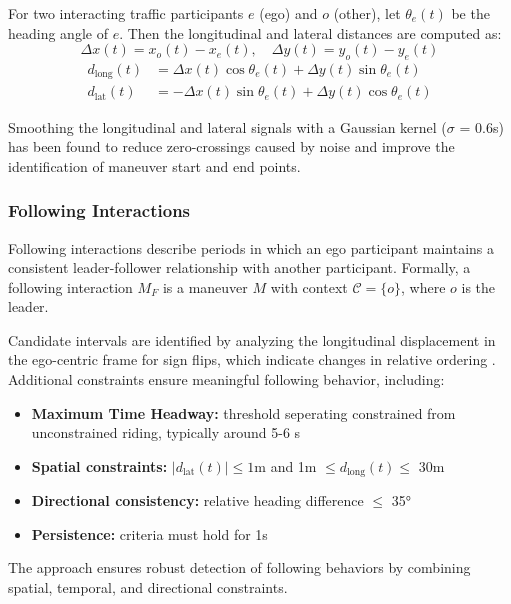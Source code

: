 For two interacting traffic participants $e$ (ego) and $o$ (other), let $\theta_e(t)$ be the heading angle of $e$. Then the longitudinal and lateral distances are computed as:
$$\Delta x(t) = x_o(t) - x_e(t), \quad \Delta y(t) = y_o(t) - y_e(t)$$
\begin{align*}
	d_{\text{long}}(t) &= \Delta x(t)\cos\theta_e(t) + \Delta y(t)\sin\theta_e(t) \\
	d_{\text{lat}}(t)  &= -\Delta x(t)\sin\theta_e(t) + \Delta y(t)\cos\theta_e(t)
\end{align*}

Smoothing the longitudinal and lateral signals with a Gaussian kernel ($\sigma$ = 0.6s) has been found to reduce zero-crossings caused by noise and improve the identification of maneuver start and end points.


\subsubsection{Following Interactions}

Following interactions describe periods in which an ego participant maintains a consistent leader-follower relationship with another participant. Formally, a following interaction $M_F$ is a maneuver $M$ with context $\mathcal{C}=\{o\}$, where $o$ is the leader.

Candidate intervals are identified by analyzing the longitudinal displacement in the ego-centric frame for sign flips, which indicate changes in relative ordering \cite{mohammed_characterization_2019}. Additional constraints ensure meaningful following behavior, including:

\begin{itemize}
	\item \textbf{Maximum Time Headway:} threshold seperating constrained from unconstrained riding, typically around 5-6 s \cite{hoogendoorn_bicycle_2016,kutsch_analyzing_2025, bachir_identifying_2025}
	\item \textbf{Spatial constraints:} $|d_{\text{lat}}(t)|\leq 1$m and 1m $\leq d_{\text{long}}(t) \leq$ 30m
	\item \textbf{Directional consistency:} relative heading difference $\leq$ 35° \cite{feng_automatic_2023, kutsch_analyzing_2025}
	\item \textbf{Persistence:} criteria must hold for 1s 
	
\end{itemize}

The approach ensures robust detection of following behaviors by combining spatial, temporal, and directional constraints.

